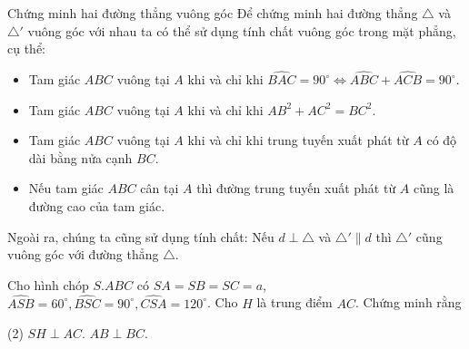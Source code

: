 \begin{dang}{Chứng minh hai đường thẳng vuông góc}
	Để chứng minh hai đường thẳng $\triangle$ và $\triangle'$ vuông góc với nhau ta có thể sử dụng tính chất vuông góc trong mặt phẳng, cụ thể:
	\begin{itemize}
		\item Tam giác $ABC$ vuông tại $A$ khi và chỉ khi $\widehat{BAC}=90^{\circ} \Leftrightarrow \widehat{ABC}+\widehat{ACB}=90^{\circ}.$
		\item Tam giác $ABC$ vuông tại $A$ khi và chỉ khi $AB^2+AC^2=BC^2.$
		\item Tam giác $ABC$ vuông tại $A$ khi và chỉ khi trung tuyến xuất phát từ $A$ có độ dài bằng nửa cạnh $BC$.
		\item Nếu tam giác $ABC$ cân tại $A$ thì đường trung tuyến xuất phát từ $A$ cũng là đường cao của tam giác.
	\end{itemize}
	Ngoài ra, chúng ta cũng sử dụng tính chất: Nếu $d\perp \triangle$ và $\triangle'\parallel d$ thì $\triangle'$ cũng vuông góc với đường thẳng $\triangle.$
\end{dang}

\begin{vd}%
	Cho hình chóp $S.ABC$ có $SA=SB=SC=a$, $\widehat{ASB}=60^{\circ}, \widehat{BSC}=90^{\circ}, \widehat{CSA}=120^{\circ}$. Cho $H$ là trung điểm $AC$. Chứng minh rằng
	\begin{tasks}(2)
		\task $SH\perp AC$.
		\task $AB\perp BC$.
	\end{tasks}
\end{vd}

